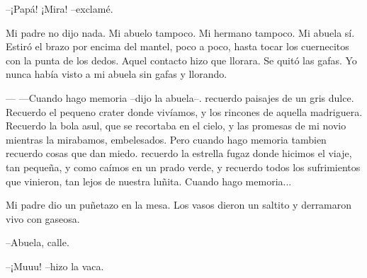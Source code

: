 \documentclass[a3paper]{tufte-handout}
\begin{document}
--¡Papá! ¡Mira! --exclamé.

Mi padre no dijo nada. Mi abuelo tampoco. Mi hermano tampoco. Mi abuela sí. Estiró el brazo por encima del mantel, poco a poco, hasta tocar los cuernecitos con la punta de los dedos. Aquel contacto hizo que llorara. Se quitó las gafas. Yo nunca había visto a mi abuela sin gafas y llorando.

--- ---Cuando hago memoria --dijo la abuela--. recuerdo paisajes de un gris dulce. Recuerdo el pequeno crater donde vivíamos, y los rincones de aquella madriguera. Recuerdo la bola asul, que se recortaba en el cielo, y las promesas de mi novio mientras la mirabamos, embelesados. Pero cuando hago memoria tambien recuerdo cosas que dan miedo. recuerdo la estrella fugaz donde hicimos el viaje, tan pequeña, y como caímos en un prado verde, y recuerdo todos los sufrimientos que vinieron, tan lejos de nuestra luñita. Cuando hago memoria...

Mi padre dio un puñetazo en la mesa. Los vasos dieron un saltito y derramaron vivo con gaseosa.

--Abuela, calle.

--¡Muuu! --hizo la vaca.



\nocite{Albert}


\end{document}

